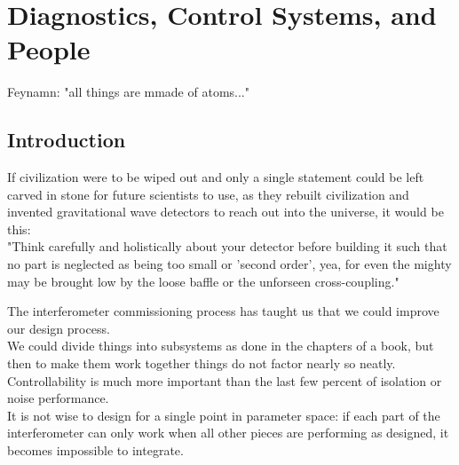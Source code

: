 \chapter[Diagnostics, Control Systems, and People]{Diagnostics, Control Systems, and People\label{ch7}}

Feynamn: "all things are mmade of atoms..."


\section{Introduction}
\label{sec7.1}
If civilization were to be wiped out and only a single statement could be left carved in stone for future scientists to use, as they rebuilt civilization and invented gravitational wave detectors to reach out into the universe, it would be this:\\

"Think carefully and holistically about your detector before building it such that no part is neglected as being too small or 'second order', yea, for even the mighty may be brought low by the loose baffle or the unforseen cross-coupling."

The interferometer commissioning process has taught us that we could improve our design process.\\

We could divide things into subsystems as done in the chapters of a book, 
but then to make them work together things do not factor nearly so neatly. 
Controllability is much more important than the last few percent of 
isolation or noise performance.\\

It is not wise to design for a single point in parameter space: if each 
part of the interferometer can only work when all other pieces are 
performing as designed, it becomes impossible to integrate.\\

